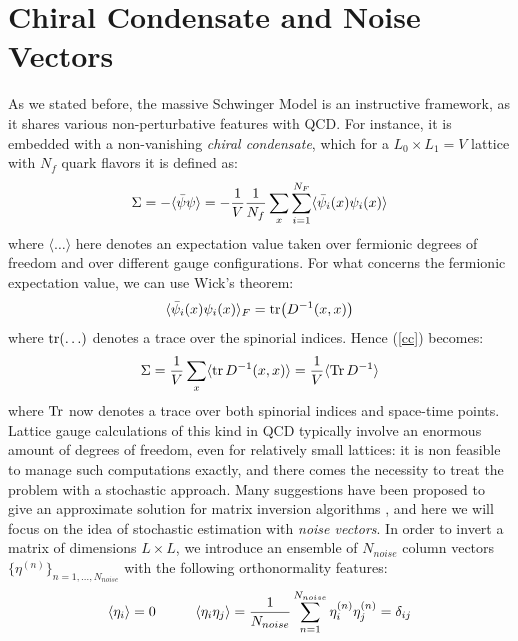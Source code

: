 \section{Chiral Condensate and Noise Vectors}
As we stated before, the massive Schwinger Model is an instructive framework, as it shares various non-perturbative features with QCD. For instance, it is embedded with a non-vanishing \textit{chiral condensate}, which for a $L_0 \times L_1 = V$ lattice with $N_f$ quark flavors it is defined as:
\begin{equation}\label{cc}
    \Sigma = - \langle \Bar{\psi} \psi \rangle = - \frac{1}{V} \frac{1}{N_f} \sum_x \sum_{i = 1}^{N_F} \langle \Bar{\psi}_i (x) \psi_i(x) \rangle 
\end{equation}
where $\langle \dots \rangle$ here denotes an expectation value taken over fermionic degrees of freedom and over different gauge configurations. For what concerns the fermionic expectation value, we can use Wick's theorem:
\begin{equation}
    \langle \Bar{\psi}_i(x) \psi_i (x) \rangle_F = \tr(D^{-1}(x,x))
\end{equation}
where $\tr(\dots)$ denotes a trace over the spinorial indices. Hence (\ref{cc}) becomes:
\begin{equation}
    \Sigma = \frac{1}{V} \sum_x \langle \tr D^{-1}(x,x) \rangle = \frac{1}{V} \langle \Tr D^{-1} \rangle
\end{equation}
where $\Tr$ now denotes a trace over both spinorial indices and space-time points.
\\ Lattice gauge calculations of this kind in QCD typically involve an enormous amount of degrees of freedom, even for relatively small lattices: it is non feasible to manage such computations exactly, and there comes the necessity to treat the problem with a stochastic approach. Many suggestions have been proposed to give an approximate solution for matrix inversion algorithms \cite{PhysRevB.34.7911, PhysRevD.32.2736, DONG1992353,BITAR1989348}, and here we will focus on the idea of stochastic estimation with \textit{noise vectors}. In order to invert a matrix of dimensions $L \times L$, we introduce an ensemble of $N_{noise}$ column vectors $\{\eta^{(n)}\}_{n = 1, \dots, N_{noise}}$ with the following orthonormality features:
\begin{equation}\label{noise}
    \langle \eta_i \rangle = 0 \hspace{10mm} \langle \eta_i \eta_j \rangle = \frac{1}{N_{noise}} \sum_{n = 1}^{N_{noise}} \eta^{(n)}_i \eta^{(n)}_j = \delta_{ij}
\end{equation}
